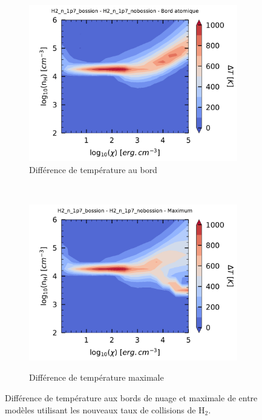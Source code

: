 \begin{figure}[!h]
    \centering
    \begin{subfigure}[t]{0.49\textwidth} %
        \centering \includegraphics[trim = {0 0 0 1cm },clip,width=1\textwidth]{figure/H2/diffgrid_bossionglover/mapTba_H2_n_1p7_bossion_H2_n_1p7_nobossion.pdf}
        \caption{Différence de température au bord}
        \label{fig:H2:Bossion:Tba}
    \end{subfigure}
    ~ 
    \begin{subfigure}[t]{0.49\textwidth}
        \centering \includegraphics[trim = {0 0 0 1cm },clip,width=1\textwidth]{figure/H2/diffgrid_bossionglover/mapTmax_H2_n_1p7_bossion_H2_n_1p7_nobossion.pdf}
         \label{fig:H2:Bossion:Tmax}
        \caption{Différence de température maximale}
        \label{fig:H2:Bossion}
    \end{subfigure}
    \caption{Différence de température aux bords de nuage et maximale de entre modèles utilisant les nouveaux taux de collisions de $\mathrm{H}_2$.}
\end{figure}

